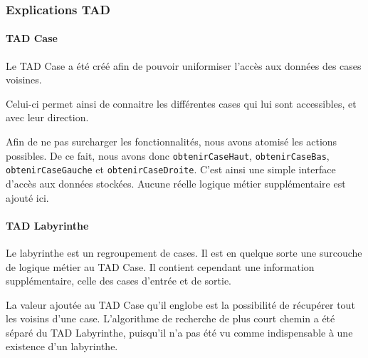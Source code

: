 \subsubsection{Explications TAD}
\paragraph{TAD Case}
Le TAD Case a été créé afin de pouvoir uniformiser l'accès aux données des cases voisines.

Celui-ci permet ainsi de connaitre les différentes cases qui lui sont accessibles, et avec leur direction.

Afin de ne pas surcharger les fonctionnalités, nous avons atomisé les actions possibles.
De ce fait, nous avons donc \verb|obtenirCaseHaut|, \verb|obtenirCaseBas|, \verb|obtenirCaseGauche| et \verb|obtenirCaseDroite|.
C'est ainsi une simple interface d'accès aux données stockées.
Aucune réelle logique métier supplémentaire est ajouté ici.

\paragraph{TAD Labyrinthe}

Le labyrinthe est un regroupement de cases.
Il est en quelque sorte une surcouche de logique métier au TAD Case.
Il contient cependant une information supplémentaire, celle des cases d'entrée et de sortie.

La valeur ajoutée au TAD Case qu'il englobe est la possibilité de récupérer tout les voisins d'une case.
L'algorithme de recherche de plus court chemin a été séparé du TAD Labyrinthe, puisqu'il n'a pas été vu comme indispensable à une existence d'un labyrinthe.


